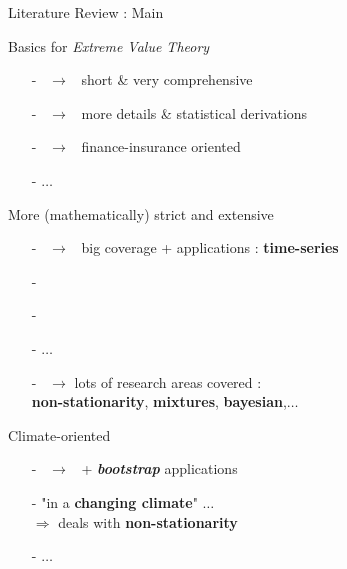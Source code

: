 \documentclass[9pt,xcolor={dvipsnames}]{beamer}
\begin{document}
\begin{frame}{ Literature Review : Main }\fontsize{7.9}{7.5}\selectfont
	\begin{block}{Basics for \emph{Extreme Value Theory}}
		\begin{itemize}
		\item[-]\textbf{\textcolor{JungleGreen}{\cite{coles_introduction_2001}}} \ $\rightarrow$ \ short \& very comprehensive
		\item[-] \textcolor{JungleGreen}{\cite{reiss_statistical_2007}} \ $\rightarrow$ \ more details \& statistical derivations
		\item[-]\textcolor{JungleGreen}{\cite{embrechts_modelling_2011}} \ $\rightarrow$ \ finance-insurance
oriented 		\item[-] \textcolor{JungleGreen}{$\dots$}
		\end{itemize}
	\end{block}
		\begin{block}{More (mathematically) strict and extensive} \begin{itemize}
			\item[-] \textbf{\textcolor{JungleGreen}{\cite{beirlant_statistics_2006}}} \ $\rightarrow$ \ big coverage + applications :\textbf{ time-series}
			\item[-] \textcolor{JungleGreen}{\cite{falk_laws_2011}}
			\item[-] \textcolor{JungleGreen}{\cite{haan_extreme_2006}}
		\item[-] \textcolor{JungleGreen}{$\dots$}
			\item[-] \textbf{\textcolor{JungleGreen}{\cite{dey_extreme_2016}}} \ $\rightarrow$ lots of research areas covered : \\ \textbf{non-stationarity}, \textbf{mixtures}, \textbf{bayesian},$\dots$
			\end{itemize}
		\end{block}
		\begin{block}{Climate-oriented}
		\begin{itemize}
			\item[-] \textcolor{JungleGreen}{\cite{mudelsee_climate_2014}} \ $\rightarrow$ \ + \emph{\textbf{bootstrap}} applications
			\item[-] \textcolor{JungleGreen}{\cite{aghakouchak_extremes_2012}} "in a \textbf{changing climate}" $\dots$\\
			 $\Rightarrow$ deals with \textbf{non-stationarity}
			 \item[-] \textcolor{JungleGreen}{$\dots$}
		\end{itemize}
		\end{block}

\end{frame}
\end{document}
